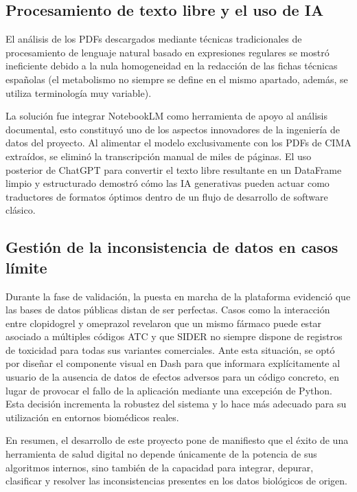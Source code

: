 \subsection*{Procesamiento de texto libre y el uso de IA}
El análisis de los PDFs descargados mediante técnicas tradicionales de procesamiento de lenguaje natural basado en expresiones regulares se mostró ineficiente debido a la nula homogeneidad en la redacción de las fichas técnicas españolas (el metabolismo no siempre se define en el mismo apartado, además, se utiliza terminología muy variable). 

La solución fue integrar NotebookLM como herramienta de apoyo al análisis documental, esto constituyó uno de los aspectos innovadores de la ingeniería de datos del proyecto. Al alimentar el modelo exclusivamente con los PDFs de CIMA extraídos, se eliminó la transcripción manual de miles de páginas. El uso posterior de ChatGPT para convertir el texto libre resultante en un DataFrame limpio y estructurado demostró cómo las IA generativas pueden actuar como traductores de formatos óptimos dentro de un flujo de desarrollo de software clásico.

\subsection*{Gestión de la inconsistencia de datos en casos límite}
Durante la fase de validación, la puesta en marcha de la plataforma evidenció que las bases de datos públicas distan de ser perfectas. Casos como la interacción entre clopidogrel y omeprazol revelaron que un mismo fármaco puede estar asociado a múltiples códigos ATC y que SIDER no siempre dispone de registros de toxicidad para todas sus variantes comerciales. Ante esta situación, se optó por diseñar el componente visual en Dash para que informara explícitamente al usuario de la ausencia de datos de efectos adversos para un código concreto, en lugar de provocar el fallo de la aplicación mediante una excepción de Python. Esta decisión incrementa la robustez del sistema y lo hace más adecuado para su utilización en entornos biomédicos reales.

En resumen, el desarrollo de este proyecto pone de manifiesto que el éxito de una herramienta de salud digital no depende únicamente de la potencia de sus algoritmos internos, sino también de la capacidad para integrar, depurar, clasificar y resolver las inconsistencias presentes en los datos biológicos de origen.

